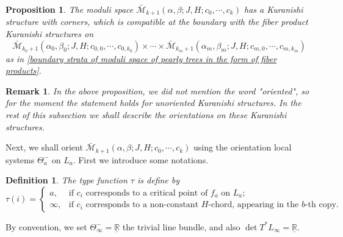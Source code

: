 \documentclass{amsart}
\newtheorem{definition}[theorem]{Definition}
\newtheorem{proposition}[theorem]{Proposition}
\newtheorem{remark}[theorem]{Remark}
\numberwithin{equation}{section}
\numberwithin{figure}{section}
\begin{document}
\begin{proposition}
	The moduli space $\bar{\mathcal{M}}_{k+1}(\alpha, \beta; J, H; c_{0}, \cdots, c_{k})$ has a Kuranishi structure with corners, which is compatible at the boundary with the fiber product Kuranishi structures on
\begin{equation*}
\bar{\mathcal{M}}_{k_{0}+1}(\alpha_{0}, \beta_{0}; J, H; c_{0, 0}, \cdots, c_{0, k_{0}}) \times \cdots \times \bar{\mathcal{M}}_{k_{m}+1}(\alpha_{m}, \beta_{m}; J, H; c_{m, 0}, \cdots, c_{m, k_{m}})
\end{equation*}
as in \eqref{boundary strata of moduli space of pearly trees in the form of fiber products}.
\end{proposition}

\begin{remark}
	In the above proposition, we did not mention the word "oriented", so for the moment the statement holds for unoriented Kuranishi structures. In the rest of this subsection we shall describe the orientations on these Kuranishi structures.
\end{remark}

	Next, we shall orient $\bar{\mathcal{M}}_{k+1}(\alpha, \beta; J, H; c_{0}, \cdots, c_{k})$ using the orientation local systems $\Theta_{a}^{-}$ on $L_{a}$. First we introduce some notations. \par

\begin{definition}
	The type function $\tau$ is define by
\begin{equation}
\tau(i) =
\begin{cases}
a, &\text{if } c_{i} \text{ corresponds to a critical point of } f_{a} \text{ on } L_{a};\\
\infty, &\text{if } c_{i} \text{ corresponds to a non-constant $H$-chord, appearing in the $b$-th copy}.
\end{cases}
\end{equation}
\end{definition}

	By convention, we set $\Theta_{\infty}^{-} = \underline{\mathbb{R}}$ the trivial line bundle, and also $\det T^{*}L_{\infty} = \underline{\mathbb{R}}$. \par
\end{document}
